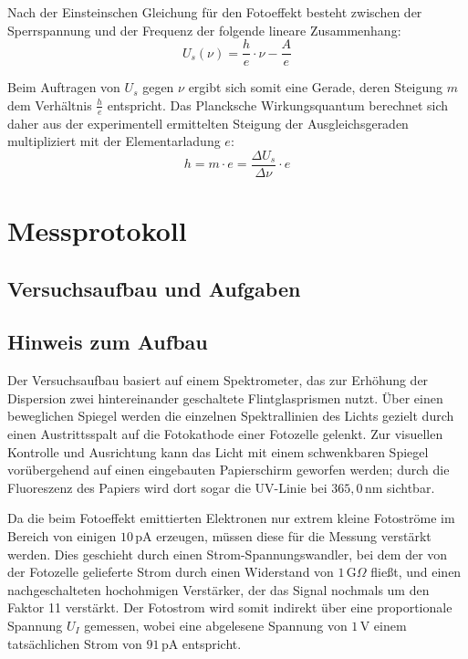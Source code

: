 \documentclass[12pt,a4paper,titlepage]{scrartcl}
\numberwithin{equation}{section}
\numberwithin{table}{section}
\numberwithin{figure}{section}
\begin{document}
Nach der Einsteinschen Gleichung für den Fotoeffekt besteht zwischen der Sperrspannung und der Frequenz der folgende lineare Zusammenhang:
\begin{equation}
    U_s(\nu) = \frac{h}{e} \cdot \nu - \frac{A}{e}\label{eq:Usperr}
\end{equation}

Beim Auftragen von $U_s$ gegen $\nu$ ergibt sich somit eine Gerade, deren Steigung $m$ dem Verhältnis $\frac{h}{e}$ entspricht. Das Plancksche Wirkungsquantum berechnet sich daher aus der experimentell ermittelten Steigung der Ausgleichsgeraden multipliziert mit der Elementarladung $e$:
\begin{equation}
    h = m \cdot e = \frac{\Delta U_s}{\Delta \nu} \cdot e\label{eq:Bestimmungplanck}
\end{equation}

\section{Messprotokoll}
\subsection{Versuchsaufbau und Aufgaben}




\subsection{Hinweis zum Aufbau}

Der Versuchsaufbau basiert auf einem Spektrometer, das zur Erhöhung der Dispersion zwei hintereinander geschaltete Flintglasprismen nutzt. Über einen beweglichen Spiegel werden die einzelnen Spektrallinien des Lichts gezielt durch einen Austrittsspalt auf die Fotokathode einer Fotozelle gelenkt. Zur visuellen Kontrolle und Ausrichtung kann das Licht mit einem schwenkbaren Spiegel vorübergehend auf einen eingebauten Papierschirm geworfen werden; durch die Fluoreszenz des Papiers wird dort sogar die UV-Linie bei $365,0\,\text{nm}$ sichtbar\cite{PAPskript}. 

Da die beim Fotoeffekt emittierten Elektronen nur extrem kleine Fotoströme im Bereich von einigen $10\,\text{pA}$ erzeugen, müssen diese für die Messung verstärkt werden. Dies geschieht durch einen Strom-Spannungswandler, bei dem der von der Fotozelle gelieferte Strom durch einen Widerstand von $1\,\text{G}\Omega$ fließt, und einen nachgeschalteten hochohmigen Verstärker, der das Signal nochmals um den Faktor 11 verstärkt. Der Fotostrom wird somit indirekt über eine proportionale Spannung $U_I$ gemessen, wobei eine abgelesene Spannung von $1\,\text{V}$ einem tatsächlichen Strom von $91\,\text{pA}$ entspricht\cite{PAPskript}.
\end{document}
